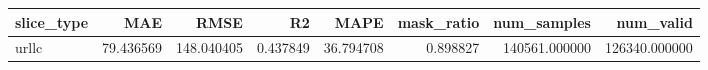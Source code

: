 \begin{tabular}{lrrrrrrr}
\toprule
slice_type & MAE & RMSE & R2 & MAPE & mask_ratio & num_samples & num_valid \\
\midrule
urllc & 79.436569 & 148.040405 & 0.437849 & 36.794708 & 0.898827 & 140561.000000 & 126340.000000 \\
\bottomrule
\end{tabular}
